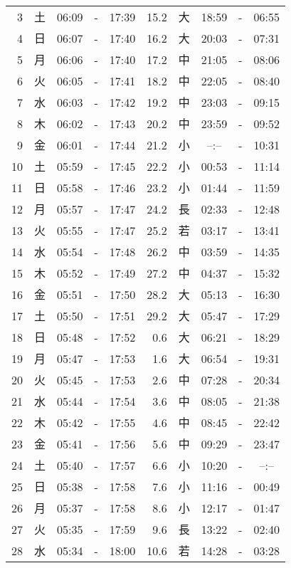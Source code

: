 \documentclass[a4j,10pt]{jsarticle}
\begin{document}
\begin{center}
\begin{table}[ht]
\begin{center}
\begin{tabular}{|rc|ccc|rc|ccc|}
  3 & 土 & 06:09 &-& 17:39 & 15.2 & 大 & 18:59 &-& 06:55 \\
  4 & 日 & 06:07 &-& 17:40 & 16.2 & 大 & 20:03 &-& 07:31 \\
  5 & 月 & 06:06 &-& 17:40 & 17.2 & 中 & 21:05 &-& 08:06 \\
  6 & 火 & 06:05 &-& 17:41 & 18.2 & 中 & 22:05 &-& 08:40 \\
  7 & 水 & 06:03 &-& 17:42 & 19.2 & 中 & 23:03 &-& 09:15 \\
  8 & 木 & 06:02 &-& 17:43 & 20.2 & 中 & 23:59 &-& 09:52 \\
  9 & 金 & 06:01 &-& 17:44 & 21.2 & 小 & --:-- &-& 10:31 \\
 10 & 土 & 05:59 &-& 17:45 & 22.2 & 小 & 00:53 &-& 11:14 \\
 11 & 日 & 05:58 &-& 17:46 & 23.2 & 小 & 01:44 &-& 11:59 \\
 12 & 月 & 05:57 &-& 17:47 & 24.2 & 長 & 02:33 &-& 12:48 \\
 13 & 火 & 05:55 &-& 17:47 & 25.2 & 若 & 03:17 &-& 13:41 \\
 14 & 水 & 05:54 &-& 17:48 & 26.2 & 中 & 03:59 &-& 14:35 \\
 15 & 木 & 05:52 &-& 17:49 & 27.2 & 中 & 04:37 &-& 15:32 \\
 16 & 金 & 05:51 &-& 17:50 & 28.2 & 大 & 05:13 &-& 16:30 \\
 17 & 土 & 05:50 &-& 17:51 & 29.2 & 大 & 05:47 &-& 17:29 \\
 18 & 日 & 05:48 &-& 17:52 &  0.6 & 大 & 06:21 &-& 18:29 \\
 19 & 月 & 05:47 &-& 17:53 &  1.6 & 大 & 06:54 &-& 19:31 \\
 20 & 火 & 05:45 &-& 17:53 &  2.6 & 中 & 07:28 &-& 20:34 \\
 21 & 水 & 05:44 &-& 17:54 &  3.6 & 中 & 08:05 &-& 21:38 \\
 22 & 木 & 05:42 &-& 17:55 &  4.6 & 中 & 08:45 &-& 22:42 \\
 23 & 金 & 05:41 &-& 17:56 &  5.6 & 中 & 09:29 &-& 23:47 \\
 24 & 土 & 05:40 &-& 17:57 &  6.6 & 小 & 10:20 &-& --:-- \\
 25 & 日 & 05:38 &-& 17:58 &  7.6 & 小 & 11:16 &-& 00:49 \\
 26 & 月 & 05:37 &-& 17:58 &  8.6 & 小 & 12:17 &-& 01:47 \\
 27 & 火 & 05:35 &-& 17:59 &  9.6 & 長 & 13:22 &-& 02:40 \\
 28 & 水 & 05:34 &-& 18:00 & 10.6 & 若 & 14:28 &-& 03:28 \\

\end{tabular}
\end{center}
\end{table}
\end{center}
\end{document}
